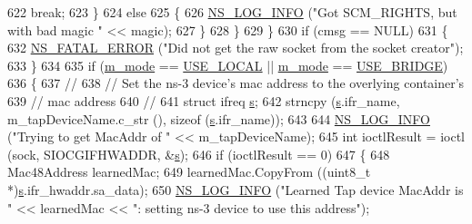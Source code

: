 \begin{DoxyCode}
622                   \textcolor{keywordflow}{break};
623                 \}
624               \textcolor{keywordflow}{else}
625                 \{
626                   \hyperlink{group__logging_gafbd73ee2cf9f26b319f49086d8e860fb}{NS\_LOG\_INFO} (\textcolor{stringliteral}{"Got SCM\_RIGHTS, but with bad magic "} << magic);
627                 \}
628             \}
629         \}
630       \textcolor{keywordflow}{if} (cmsg == NULL)
631         \{
632           \hyperlink{group__fatal_ga5131d5e3f75d7d4cbfd706ac456fdc85}{NS\_FATAL\_ERROR} (\textcolor{stringliteral}{"Did not get the raw socket from the socket creator"});
633         \}
634 
635       \textcolor{keywordflow}{if} (\hyperlink{classns3_1_1TapBridge_aaae30bc9d5dd36e3a4d569cf9bcf40eb}{m\_mode} == \hyperlink{classns3_1_1TapBridge_acac8d3ebe259ddfa9cd369515f04618daa73ff9ba9e1659aeda35d7181b601c75}{USE\_LOCAL} || \hyperlink{classns3_1_1TapBridge_aaae30bc9d5dd36e3a4d569cf9bcf40eb}{m\_mode} == \hyperlink{classns3_1_1TapBridge_acac8d3ebe259ddfa9cd369515f04618da33daa0eda93d6ec20fc491d7c440fc8d}{USE\_BRIDGE})
636         \{
637           \textcolor{comment}{//}
638           \textcolor{comment}{// Set the ns-3 device's mac address to the overlying container's}
639           \textcolor{comment}{// mac address}
640           \textcolor{comment}{//}
641           \textcolor{keyword}{struct }ifreq \hyperlink{generate__test__data__lte__sinr_8m_ad83eeb3a142285d1243a08c6b7026df8}{s};
642           strncpy (\hyperlink{generate__test__data__lte__sinr_8m_ad83eeb3a142285d1243a08c6b7026df8}{s}.ifr\_name, m\_tapDeviceName.c\_str (), \textcolor{keyword}{sizeof} (\hyperlink{generate__test__data__lte__sinr_8m_ad83eeb3a142285d1243a08c6b7026df8}{s}.ifr\_name));
643 
644           \hyperlink{group__logging_gafbd73ee2cf9f26b319f49086d8e860fb}{NS\_LOG\_INFO} (\textcolor{stringliteral}{"Trying to get MacAddr of "} << m\_tapDeviceName);
645           \textcolor{keywordtype}{int} ioctlResult = ioctl (sock, SIOCGIFHWADDR, &\hyperlink{generate__test__data__lte__sinr_8m_ad83eeb3a142285d1243a08c6b7026df8}{s});
646           \textcolor{keywordflow}{if} (ioctlResult == 0)
647             \{
648               Mac48Address learnedMac;
649               learnedMac.CopyFrom ((uint8\_t *)\hyperlink{generate__test__data__lte__sinr_8m_ad83eeb3a142285d1243a08c6b7026df8}{s}.ifr\_hwaddr.sa\_data);
650               \hyperlink{group__logging_gafbd73ee2cf9f26b319f49086d8e860fb}{NS\_LOG\_INFO} (\textcolor{stringliteral}{"Learned Tap device MacAddr is "} << learnedMac << \textcolor{stringliteral}{": setting ns-3
       device to use this address"});

\end{DoxyCode}
